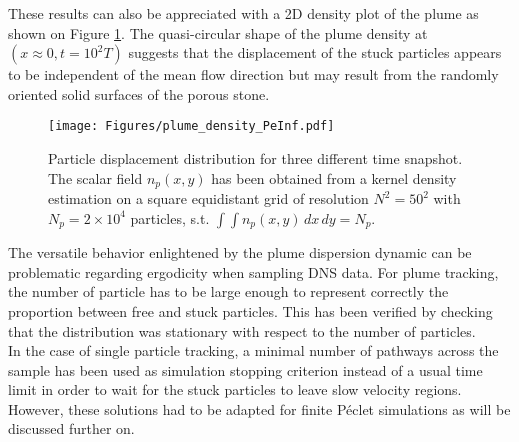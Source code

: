 These results can also be appreciated with a 2D density plot of the plume as shown on Figure \ref{fig:plume_density_peinf}. 
The quasi-circular shape of the plume density at $(x\approx 0, t=10^2 T)$ suggests that the displacement of the stuck particles appears to be independent of the mean flow direction but may result from the randomly oriented solid surfaces of the porous stone.
\begin{figure}
	\centering
	\texttt{[image: Figures/plume\_density\_PeInf.pdf]}
	\caption{Particle displacement distribution for three different time snapshot. The scalar field $n_p(x,y)$ has been obtained from a kernel density estimation on a square equidistant grid of resolution $N^2=50^2$ with $N_p = 2\times 10^4$ particles, s.t. $\int\int n_p(x,y)\,dx\,dy = N_p$.}
	\label{fig:plume_density_peinf}
\end{figure}

The versatile behavior enlightened by the plume dispersion dynamic can be problematic regarding ergodicity when sampling DNS data.
For plume tracking, the number of particle has to be large enough to represent correctly the proportion between free and stuck particles.
This has been verified by checking that the distribution was stationary with respect to the number of particles.\\
In the case of single particle tracking, a minimal number of pathways across the sample has been used as simulation stopping criterion instead of a usual time limit in order to wait for the stuck particles to leave slow velocity regions.
However, these solutions had to be adapted for finite Péclet simulations as will be discussed further on.

